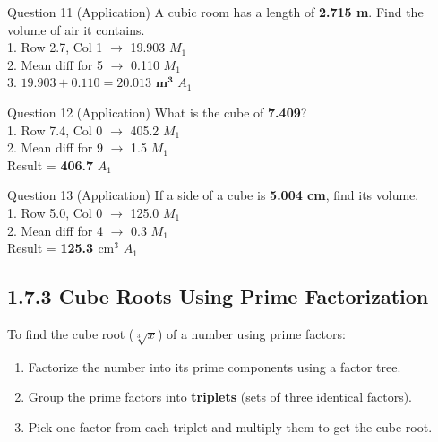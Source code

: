 \documentclass[12pt, a4paper, oneside]{article}
\begin{document}
\begin{solvingbox}{Question 11 (Application)}
A cubic room has a length of \textbf{2.715 m}. Find the volume of air it contains. \\
1. Row 2.7, Col 1 $\rightarrow$ 19.903 \hfill $M_1$ \\
2. Mean diff for 5 $\rightarrow$ 0.110 \hfill $M_1$ \\
3. $19.903 + 0.110 = \mathbf{20.013\text{ m}^3}$ \hfill $A_1$
\end{solvingbox}

\begin{solvingbox}{Question 12 (Application)}
What is the cube of \textbf{7.409}? \\
1. Row 7.4, Col 0 $\rightarrow$ 405.2 \hfill $M_1$ \\
2. Mean diff for 9 $\rightarrow$ 1.5 \hfill $M_1$ \\
Result = \textbf{406.7} \hfill $A_1$
\end{solvingbox}

\begin{solvingbox}{Question 13 (Application)}
If a side of a cube is \textbf{5.004 cm}, find its volume. \\
1. Row 5.0, Col 0 $\rightarrow$ 125.0 \hfill $M_1$ \\
2. Mean diff for 4 $\rightarrow$ 0.3 \hfill $M_1$ \\
Result = \textbf{125.3 $\text{cm}^3$} \hfill $A_1$
\end{solvingbox}

\subsection*{1.7.3 Cube Roots Using Prime Factorization}

\begin{tcolorbox}[colback=lightgrey, colframe=primaryblue, title=\textbf{Concept Summary}, arc=5pt]
    To find the cube root ($\sqrt[3]{x}$) of a number using prime factors:
    \begin{enumerate}
        \item Factorize the number into its prime components using a factor tree.
        \item Group the prime factors into \textbf{triplets} (sets of three identical factors).
        \item Pick one factor from each triplet and multiply them to get the cube root.
    \end{enumerate}
\end{tcolorbox}
\end{document}
